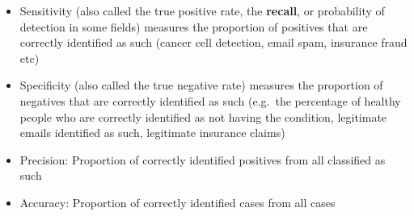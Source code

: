 \documentclass[
]{article}
\providecommand{\tightlist}{%
  \setlength{\itemsep}{0pt}\setlength{\parskip}{0pt}}
\begin{document}
\begin{itemize}
\tightlist
\item
  Sensitivity (also called the true positive rate, the \textbf{recall},
  or probability of detection in some fields) measures the proportion of
  positives that are correctly identified as such (cancer cell
  detection, email spam, insurance fraud etc)\\
\item
  Specificity (also called the true negative rate) measures the
  proportion of negatives that are correctly identified as such
  (e.g.~the percentage of healthy people who are correctly identified as
  not having the condition, legitimate emails identified as such,
  legitimate insurance claims)\\
\item
  Precision: Proportion of correctly identified positives from all
  classified as such\\
\item
  Accuracy: Proportion of correctly identified cases from all cases
\end{itemize}
\end{document}
